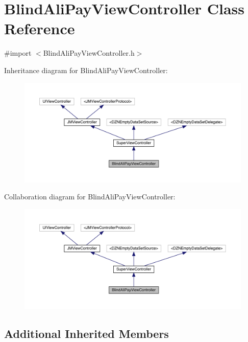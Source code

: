 \hypertarget{interface_blind_ali_pay_view_controller}{}\section{Blind\+Ali\+Pay\+View\+Controller Class Reference}
\label{interface_blind_ali_pay_view_controller}


{\ttfamily \#import $<$Blind\+Ali\+Pay\+View\+Controller.\+h$>$}



Inheritance diagram for Blind\+Ali\+Pay\+View\+Controller\+:\nopagebreak
\begin{figure}[H]
\begin{center}
\leavevmode
\includegraphics[width=350pt]{interface_blind_ali_pay_view_controller__inherit__graph}
\end{center}
\end{figure}


Collaboration diagram for Blind\+Ali\+Pay\+View\+Controller\+:\nopagebreak
\begin{figure}[H]
\begin{center}
\leavevmode
\includegraphics[width=350pt]{interface_blind_ali_pay_view_controller__coll__graph}
\end{center}
\end{figure}
\subsection*{Additional Inherited Members}


